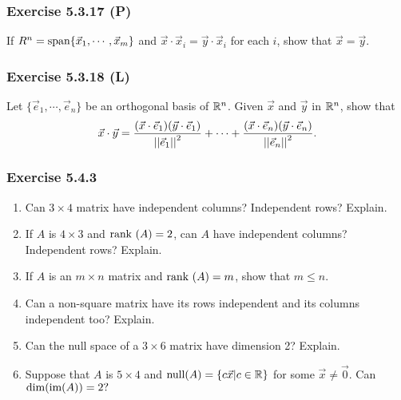 \documentclass[pdf,9pt,t]{beamer}
\begin{document}
\begin{frame}[fragile]
    \frametitle{Exercise 5.3.17 (P)}
    \begin{problem}
	If $R^n=\mbox{span}\{\vec{x}_1,\cdots,\vec{x}_m\}$ and $\vec{x}\cdot \vec{x}_i=\vec{y}\cdot \vec{x}_i$ for each $i$, show that $\vec{x}=\vec{y}$.
    \end{problem}

\end{frame}
\begin{frame}[fragile]
    \frametitle{Exercise 5.3.18 (L)}
    \begin{problem}
	Let $\{\vec{e}_1,\cdots,\vec{e}_n\}$ be an orthogonal basis of $\mathbb{R}^n$. Given $\vec{x}$ and $\vec{y}$ in $\mathbb{R}^n$, show that
	\begin{align*}
	    \vec{x} \cdot \vec{y} = \frac{(\vec{x}\cdot \vec{e}_1)(\vec{y}\cdot \vec{e}_1)}{\left|\left| \vec{e}_1 \right|\right|^2} + \cdots + \frac{(\vec{x}\cdot \vec{e}_n)(\vec{y}\cdot \vec{e}_n)}{\left|\left| \vec{e}_n \right|\right|^2}.
	\end{align*}
    \end{problem}

\end{frame}
\begin{frame}[fragile]
    \frametitle{Exercise 5.4.3}
    \begin{problem}
	\begin{enumerate}
	    \item Can $3\times 4$ matrix have independent columns? Independent rows? Explain.
	    \item If $A$ is $4\times 3$ and $\mbox{rank }(A)=2$, can $A$ have independent columns? Independent rows? Explain.
	    \item If $A$ is an $m \times n$ matrix and $\mbox{rank }(A)=m$, show that $m\le n$.
	    \item Can a non-square matrix have its rows independent and its columns independent too? Explain.
	    \item Can the null space of a $3\times 6$ matrix have dimension 2? Explain.
	    \item Suppose that $A$ is $5\times 4$ and $\mbox{null}(A)=\{c \vec{x}| c\in\mathbb{R} \}$ for some $\vec{x}\ne \vec{0}$. Can $\dim(\mbox{im}(A))=2?$
	\end{enumerate}
    \end{problem}

\end{frame}
\end{document}
